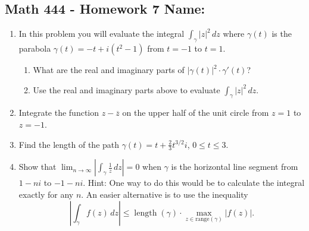 \documentclass[11pt]{article}
\newcommand{\ds}{\displaystyle}
\begin{document}
\pagestyle{empty} 
\subsection*{Math 444 - Homework 7 \hfill Name: \underline{\hspace*{2in}}}

\begin{enumerate}


\item In this problem you will evaluate the integral $\ds \int_\gamma |z|^2 \, dz$ where $\gamma(t)$ is the parabola $\gamma(t) = -t + i(t^2-1)$ from $t=-1$ to $t = 1$. 
\begin{enumerate}
\item What are the real and imaginary parts of $|\gamma(t)|^2 \cdot \gamma'(t)$?
\vfill

\item Use the real and imaginary parts above to evaluate $\ds \int_\gamma |z|^2 \, dz$.
\end{enumerate}
\vfill

\item Integrate the function $z - \overline{z}$ on the upper half of the unit circle from $z=1$ to $z=-1$. 
\vfill




\item Find the length of the path $\gamma(t) = t + \tfrac{2}{3} t^{3/2} i$, $0 \le t \le 3$.  
\vfill 


\newpage

\item Show that $\ds \lim_{n \rightarrow \infty} \left| \int_\gamma \frac{1}{z} \, dz \right|=0$ when $\gamma$ is the horizontal line segment from $1-ni$ to $-1 - ni$. Hint: One way to do this would be to calculate the integral exactly for any $n$. An easier alternative is to use the inequality
$$\left| \int_\gamma f(z) \, dz \right| \le \operatorname{length}(\gamma) \cdot \max_{z \in \text{range}(\gamma)} |f(z)|.$$
\vfill  
\vfill  
\vfill  

\setcounter{enumCount}{\theenumi}
\end{enumerate}
\end{document}
